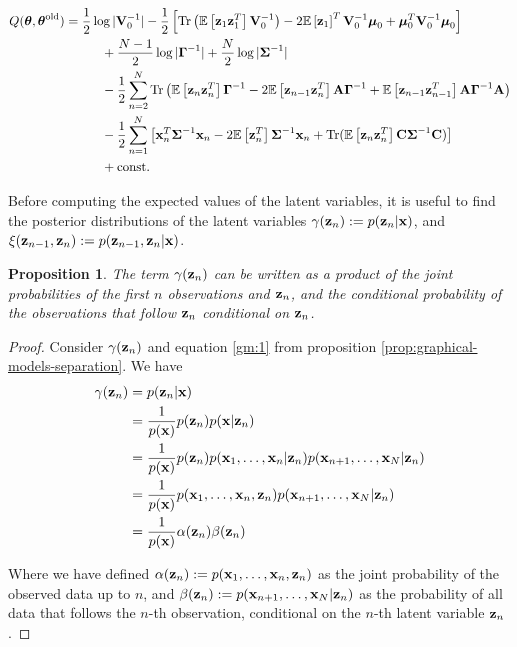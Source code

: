 \documentclass[11pt]{article}
\numberwithin{equation}{section}
\newcommand{\x}{{\bf x}}
\newcommand{\z}{{\bf z}}
\newtheorem{proposition}{Proposition}[section]
\begin{document}
\begin{align}
	Q(\boldsymbol\theta, \boldsymbol\theta^\text{old}) &= \frac{1}{2}\log \vert
	  {\bf V}_0^{-1}\vert -\frac{1}{2}\left[\text{Tr}\left(\mathbb{E}\left[\z_1 \z_1^T\right] {\bf V}_0^{-1}\right) -2 \mathbb{E}\left[\z_1\right]^T{\bf V}_0^{-1}\boldsymbol\mu_0 + \boldsymbol\mu_0^T {\bf V}_0^{-1}\boldsymbol\mu_0\right] \nonumber \\
	  &\hspace{1cm}+ \frac{N-1}{2}\log\vert\boldsymbol\Gamma^{-1}\vert + \frac{N}{2}\log\vert \boldsymbol\Sigma^{-1}\vert \nonumber \\
	  &\hspace{1cm}-\frac{1}{2} \sum_{n=2}^{N}\text{Tr}\left(\mathbb{E}\left[\z_n\z_n^T\right]\boldsymbol\Gamma^{-1} -2\mathbb{E}\left[ \z_{n-1}\z_n^T\right]{\bf A}\boldsymbol\Gamma^{-1} + \mathbb{E}\left[\z_{n-1}\z_{n-1}^T\right]{\bf A}\boldsymbol\Gamma^{-1}{\bf A}\right) \nonumber\\
	  &\hspace{1cm}-\frac{1}{2}\sum_{n=1}^N\left[\x_n^T\boldsymbol{\Sigma}^{-1}\x_n-2\mathbb{E}\left[\z_n^T\right]\boldsymbol\Sigma^{-1}\x_n + \text{Tr}(\mathbb{E}\left[\z_n\z_n^T\right]{\bf C}\boldsymbol\Sigma^{-1}{\bf C})\right] \nonumber\\
	  &\hspace{1cm} + \text{const.} \label{eq:Q-LDS}
\end{align}

Before computing the expected values of the latent variables, it is useful to find the posterior distributions of the latent variables $\gamma(\z_n) := p(\z_n\vert \x)$, and $\xi(\z_{n-1}, \z_{n}) := p(\z_{n-1}, \z_n\vert \x)$. %

\begin{proposition}
	The term $\gamma(\z_n)$ can be written as a product of the joint probabilities of the first $n$ observations and $\z_n$, and the conditional probability of the observations that follow $\z_n$ conditional on $\z_n$.
\end{proposition}

\begin{proof}\label{prop:gamma-factorisation}
Consider  $\gamma(\z_n)$ and equation \ref{gm:1} from proposition \ref{prop:graphical-models-separation}. We have
\begin{align}
	\gamma(\z_n) &= p(\z_n \vert \x)\\
					  &= \frac{1}{p(\x)}p(\z_n)p(\x \vert \z_n)\\
					  &= \frac{1}{p(\x)} p(\z_n) p(\x_1, \ldots, \x_n\vert \z_n) p(\x_{n+1}, \ldots, \x_N\vert \z_n)\\
					  &= \frac{1}{p(\x)}p(\x_1, \ldots, \x_n, \z_n) p(\x_{n+1}, \ldots, \x_N\vert \z_n)\\
					  &= \frac{1}{p(\x)}\alpha(\z_n)\beta(\z_n)
\end{align}

Where we have defined $\alpha(\z_n) := p(\x_1, \ldots, \x_n, \z_n)$ as the joint probability of the observed data up to $n$, and $\beta(\z_n) := p(\x_{n+1}, \ldots, \x_N\vert \z_n)$ as the probability of all data that follows the $n$-th observation, conditional on the $n$-th latent variable $\z_n$.
\end{proof}
\end{document}
